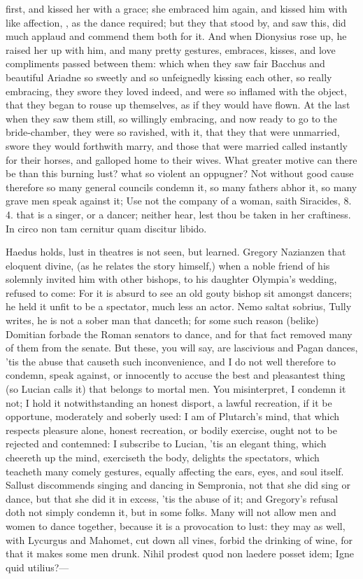 {first, and kissed her with a grace; she embraced him again, and kissed
him with like affection, \etc{}, as the dance required; but they that
stood by, and saw this, did much applaud and commend them both for it.
And when Dionysius rose up, he raised her up with him, and many pretty
gestures, embraces, kisses, and love compliments passed between them:
which when they saw fair Bacchus and beautiful Ariadne so sweetly and
so unfeignedly kissing each other, so really embracing, they swore they
loved indeed, and were so inflamed with the object, that they began to
rouse up themselves, as if they would have flown. At the last when they
saw them still, so willingly embracing, and now ready to go to the
bride-chamber, they were so ravished, with it, that they that were
unmarried, swore they would forthwith marry, and those that were
married called instantly for their horses, and galloped home to their
wives. What greater motive can there be than this burning lust? what so
violent an oppugner? Not without good cause therefore so many general
councils condemn it, so many fathers abhor it, so many grave men speak
against it; Use not the company of a woman, saith Siracides, 8. 4. that
is a singer, or a dancer; neither hear, lest thou be taken in her
craftiness. In circo non tam cernitur quam discitur libido.

Haedus holds, lust in theatres is not seen, but learned. Gregory
Nazianzen that eloquent divine, (as he relates the story
himself,) when a noble friend of his solemnly invited him with other
bishops, to his daughter Olympia's wedding, refused to come: For
it is absurd to see an old gouty bishop sit amongst dancers; he held it
unfit to be a spectator, much less an actor. Nemo saltat sobrius, Tully
writes, he is not a sober man that danceth; for some such reason
(belike) Domitian forbade the Roman senators to dance, and for that
fact removed many of them from the senate. But these, you will say, are
lascivious and Pagan dances, 'tis the abuse that causeth such
inconvenience, and I do not well therefore to condemn, speak against,
or innocently to accuse the best and pleasantest thing (so Lucian
calls it) that belongs to mortal men. You misinterpret, I condemn it
not; I hold it notwithstanding an honest disport, a lawful recreation,
if it be opportune, moderately and soberly used: I am of Plutarch's
mind, that which respects pleasure alone, honest recreation, or
bodily exercise, ought not to be rejected and contemned: I subscribe to
Lucian, 'tis an elegant thing, which cheereth up the mind,
exerciseth the body, delights the spectators, which teacheth many
comely gestures, equally affecting the ears, eyes, and soul itself.
Sallust discommends singing and dancing in Sempronia, not that she did
sing or dance, but that she did it in excess, 'tis the abuse of it; and
Gregory's refusal doth not simply condemn it, but in some folks. Many
will not allow men and women to dance together, because it is a
provocation to lust: they may as well, with Lycurgus and Mahomet, cut
down all vines, forbid the drinking of wine, for that it makes some men
drunk.
Nihil prodest quod non laedere posset idem;
Igne quid utilius?---

}
